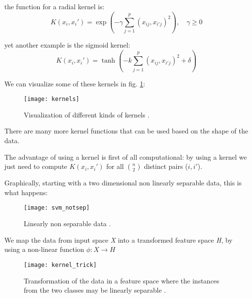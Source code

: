 the function for a radial kernel is:
\begin{equation} \label{eq:svm14}
	K(x_i, x_i') = \exp(-\gamma\sum_{j=1}^{p} (x_{ij}, x_{i'j})^2), \quad \gamma \ge 0
\end{equation} 

yet another example is the sigmoid kernel:
\begin{equation} \label{eq:svm15}
	K(x_i, x_i') = \tanh(-k\sum_{j=1}^{p} (x_{ij}, x_{i'j})^2 + \delta)
\end{equation}


We can visualize some of these kernels in fig. \ref{fig:kernels}:
\begin{figure}[H]
	\centering
	\texttt{[image: kernels]}
	\caption{Visualization of different kinds of kernels \cite{kernels}.}
	\label{fig:kernels}
\end{figure} 

\clearpage

There are many more kernel functions that can be used based on the shape of the data.

The advantage of using a kernel is first of all computational: by using a kernel we just need to compute $K(x_i, x_i')$ for all $n \choose 2$ distinct pairs ($i, i'$).

Graphically, starting with a two dimensional non linearly separable data, this is what happens:
\begin{figure}[H]
	\centering
	\texttt{[image: svm\_notsep]}
	\caption{Linearly non separable data \cite{kernel_trick}.}
\end{figure} 

We map the data from input space \textit{X} into a transformed feature space \textit{H}, by using a non-linear function $\phi: X \rightarrow H$

\begin{figure}[H]
	\centering
	\texttt{[image: kernel\_trick]}
	\caption{Transformation of the data in a feature space where the instances from the two classes may be linearly separable \cite{kernel_trick}.}
\end{figure} 

\clearpage

